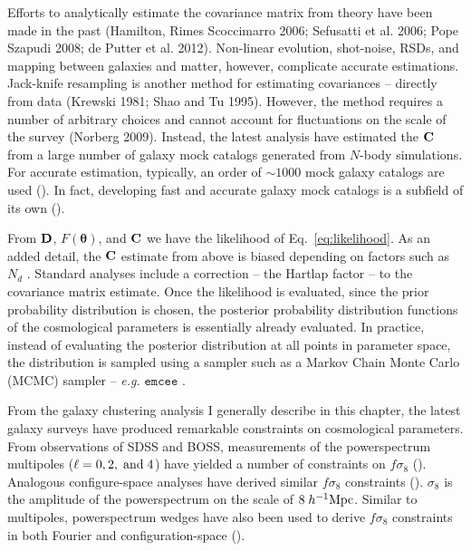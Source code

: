 Efforts to analytically estimate the covariance matrix from theory have been made in the past
(Hamilton, Rimes Scoccimarro 2006; Sefusatti et al. 2006; Pope Szapudi 2008; de Putter et al. 2012). 
Non-linear evolution, shot-noise, RSDs, and mapping between galaxies and matter, however,
complicate accurate estimations. Jack-knife resampling is another method for estimating 
covariances -- directly from data (Krewski 1981; Shao and Tu 1995). However, the method 
requires a number of arbitrary choices and cannot account for fluctuations on the scale 
of the survey (Norberg 2009). Instead, the latest analysis have estimated the ${\bf C}$ 
from a large number of galaxy mock catalogs generated from $N$-body simulations. For 
accurate estimation, typically, an order of $\sim 1000$ mock galaxy catalogs are used ().
In fact, developing fast and accurate galaxy mock catalogs is a subfield of its own 
(). 

From ${\bf D}$, $F(\boldsymbol{\theta})$, and ${\bf C}$ we have the likelihood of 
Eq.~\ref{eq:likelihood}. As an added detail, the ${\bf C}$ estimate from above is 
biased depending on factors such as $N_d$ \citep{hartlap2007}. Standard analyses 
include a correction -- the Hartlap factor -- to the covariance matrix estimate. Once the 
likelihood is evaluated, since the prior probability distribution is chosen, the posterior 
probability distribution functions of the cosmological parameters is essentially already 
evaluated. In practice, instead of evaluating the posterior distribution at all points in 
parameter space, the distribution is sampled using a sampler such as a Markov Chain Monte 
Carlo (MCMC) sampler -- \emph{e.g.} $\mathtt{emcee}$ \citep[][]{emcee}.

From the galaxy clustering analysis I generally describe in this chapter, the latest 
galaxy surveys have produced remarkable constraints on cosmological parameters. 
From observations of SDSS and BOSS, measurements of the powerspectrum multipoles 
($\ell = 0, 2,\;{\rm and}\;4$) have yielded a number of constraints on $f\sigma_8$ 
(). Analogous configure-space analyses
have derived similar $f \sigma_8$ constraints (). $\sigma_8$ 
is the amplitude of the powerspectrum on the scale of $8\;h^{-1}{\rm Mpc}$. 
Similar to multipoles, powerspectrum wedges have also been used to derive $f\sigma_8$ 
constraints in both Fourier and configuration-space (). 

